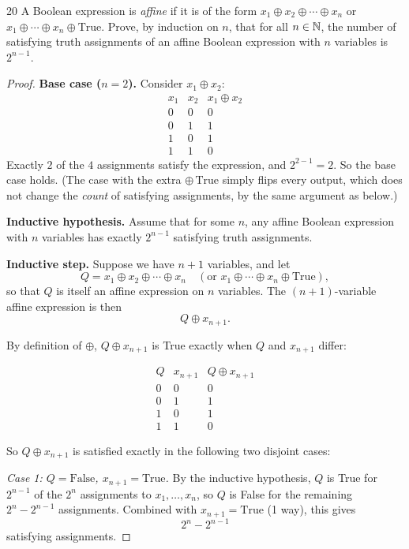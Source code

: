 \begin{exercise}{20}
    A Boolean expression is \emph{affine} if it is of the form
    $x_1\oplus x_2\oplus\cdots\oplus x_n$ or
    $x_1\oplus\cdots\oplus x_n\oplus\mathrm{True}$. Prove, by induction on $n$,
    that for all $n\in\mathbb{N}$, the number of satisfying truth assignments of an
    affine Boolean expression with $n$ variables is $2^{n-1}$.
\end{exercise}
\begin{solbox}[long]

\begin{proof}
\textbf{Base case ($n=2$).} Consider $x_1\oplus x_2$:
\[
\begin{array}{cc|c}
x_1 & x_2 & x_1\oplus x_2\\
\hline
0&0&0\\
0&1&1\\
1&0&1\\
1&1&0
\end{array}
\]
Exactly $2$ of the $4$ assignments satisfy the expression, and $2^{2-1}=2$. So the base case holds. (The case with the extra $\oplus\,\text{True}$ simply flips every output, which does not change the \emph{count} of satisfying assignments, by the same argument as below.)

\bigskip
\noindent\textbf{Inductive hypothesis.} Assume that for some $n$, any affine Boolean expression with $n$ variables has exactly $2^{n-1}$ satisfying truth assignments.

\bigskip
\noindent\textbf{Inductive step.} Suppose we have $n+1$ variables, and let
\[
Q = x_1\oplus x_2\oplus\cdots\oplus x_n \quad(\text{or } x_1\oplus\cdots\oplus x_n\oplus\text{True}),
\]
so that $Q$ is itself an affine expression on $n$ variables. The $(n+1)$-variable affine expression is then
\[
Q\oplus x_{n+1}.
\]

By definition of $\oplus$, $Q\oplus x_{n+1}$ is True exactly when $Q$ and $x_{n+1}$ differ:

\[
\begin{array}{cc|c}
Q & x_{n+1} & Q\oplus x_{n+1}\\
\hline
0&0&0\\
0&1&1\\
1&0&1\\
1&1&0
\end{array}
\]

So $Q\oplus x_{n+1}$ is satisfied exactly in the following two disjoint cases:

\smallskip
\noindent\textit{Case 1: $Q=\text{False}$, $x_{n+1}=\text{True}$.} By the inductive hypothesis, $Q$ is True for $2^{n-1}$ of the $2^n$ assignments to $x_1,\dots,x_n$, so $Q$ is False for the remaining $2^n-2^{n-1}$ assignments. Combined with $x_{n+1}=\text{True}$ (1 way), this gives
\[
2^n-2^{n-1}
\]
satisfying assignments.


\end{proof}
\end{solbox}
